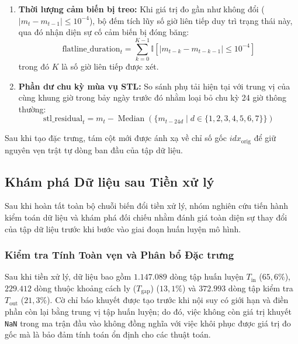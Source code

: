 \begin{enumerate}
\begin{enumerate}
\begin{equation*}
        \end{equation*}
        \item \textbf{Thời lượng cảm biến bị treo:} Khi giá trị đo gần như không đổi ($|m_t-m_{t-1}|\leq 10^{-4}$), bộ đếm tích lũy số giờ liên tiếp duy trì trạng thái này, qua đó nhận diện sự cố cảm biến bị đóng băng:
        \begin{equation*}
            \text{flatline\_duration}_t=
            \sum_{k=0}^{K-1}\mathbb{I}\left[|m_{t-k}-m_{t-k-1}|\leq 10^{-4}\right]
        \end{equation*}
        trong đó $K$ là số giờ liên tiếp được xét.
        \item \textbf{Phần dư chu kỳ mùa vụ STL:} So sánh phụ tải hiện tại với trung vị của cùng khung giờ trong bảy ngày trước đó nhằm loại bỏ chu kỳ 24 giờ thông thường:
        \begin{equation*}
            \text{stl\_residual}_t=
            m_t-\operatorname{Median}\left(\{m_{t-24d}\mid d\in\{1,2,3,4,5,6,7\}\}\right)
        \end{equation*}
    \end{enumerate}
    Sau khi tạo đặc trưng, tám cột mới được ánh xạ về chỉ số gốc $idx_{\text{orig}}$ để giữ nguyên vẹn trật tự dòng ban đầu của tập dữ liệu.
\end{enumerate}

\subsection{Khám phá Dữ liệu sau Tiền xử lý}

Sau khi hoàn tất toàn bộ chuỗi biến đổi tiền xử lý, nhóm nghiên cứu tiến hành kiểm toán dữ liệu và khám phá đối chiếu nhằm đánh giá toàn diện sự thay đổi của tập dữ liệu trước khi bước vào giai đoạn huấn luyện mô hình.

\subsubsection{Kiểm tra Tính Toàn vẹn và Phân bổ Đặc trưng}
Sau khi tiền xử lý, dữ liệu bao gồm $1.147.089$ dòng tập huấn luyện $T_{\text{in}}$ ($65{,}6\%$), $229.412$ dòng thuộc khoảng cách ly ($T_{\text{gap}}$) ($13{,}1\%$) và $372.993$ dòng tập kiểm tra $T_{\text{out}}$ ($21{,}3\%$). Cờ chỉ báo khuyết được tạo trước khi nội suy có giới hạn và điền phần còn lại bằng trung vị tập huấn luyện; do đó, việc không còn giá trị khuyết \texttt{NaN} trong ma trận đầu vào không đồng nghĩa với việc khôi phục được giá trị đo gốc mà là bảo đảm tính toán ổn định cho các thuật toán.

